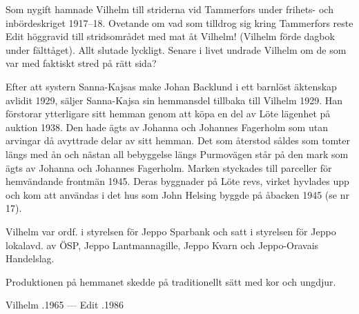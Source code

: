 Som nygift hamnade Vilhelm till striderna vid Tammerfors under frihets- och inbördeskriget 1917--18. Ovetande om vad som tilldrog sig kring Tammerfors reste Edit höggravid till stridsområdet med mat åt Vilhelm! (Vilhelm förde dagbok under fälttåget). Allt slutade lyckligt. Senare i livet undrade Vilhelm om de som var med faktiskt stred på rätt sida?

Efter att systern Sanna-Kajsas make Johan Backlund i ett barnlöst äktenskap avlidit 1929, säljer Sanna-Kajsa sin hemmansdel tillbaka till Vilhelm 1929. Han förstorar ytterligare sitt hemman genom att köpa en del av Löte lägenhet på auktion 1938. Den hade ägts av Johanna och Johannes Fagerholm som utan arvingar då  avyttrade  delar av sitt hemman. Det som återstod såldes som tomter längs med ån och nästan all bebyggelse längs Purmovägen står på den mark som ägts av Johanna och Johannes Fagerholm. Marken styckades till parceller för hemvändande frontmän 1945. Deras byggnader på Löte revs, virket hyvlades upp och kom att användas i det hus som John Helsing byggde på åbacken 1945 (se nr 17).

Vilhelm var ordf. i styrelsen för Jeppo Sparbank och satt i styrelsen för Jeppo lokalavd. av ÖSP, Jeppo Lantmannagille, Jeppo Kvarn och Jeppo-Oravais Handelslag.
\begin{jhchildren}
  \item {}
  \item {}
  \item {}
  \item {}
\end{jhchildren}
Produktionen på hemmanet skedde på traditionellt sätt med kor och ungdjur.

Vilhelm .1965  ---  Edit .1986


